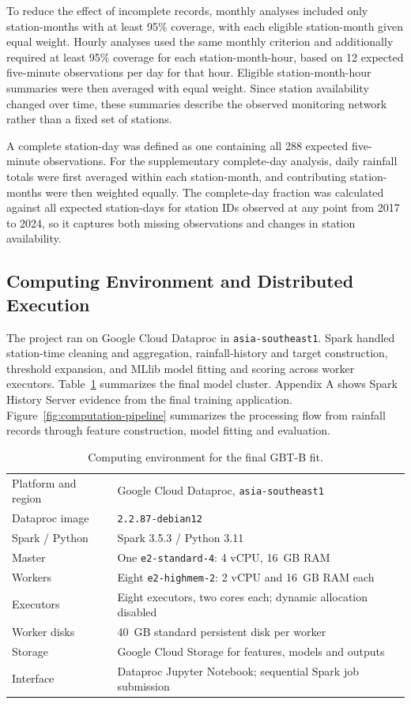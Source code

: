 \documentclass[11pt,a4paper]{article}
\begin{document}
To reduce the effect of incomplete records, monthly analyses included only
station-months with at least 95\% coverage, with each eligible station-month
given equal weight. Hourly analyses used the same monthly criterion and
additionally required at least 95\% coverage for each station-month-hour, based
on 12 expected five-minute observations per day for that hour. Eligible
station-month-hour summaries were then averaged with equal weight. Since
station availability changed over time, these summaries describe the observed
monitoring network rather than a fixed set of stations.

A complete station-day was defined as one containing all 288 expected
five-minute observations. For the supplementary complete-day analysis, daily
rainfall totals were first averaged within each station-month, and contributing
station-months were then weighted equally. The complete-day fraction was
calculated against all expected station-days for station IDs observed at any
point from 2017 to 2024, so it captures both missing observations and changes
in station availability.

\subsection{Computing Environment and Distributed Execution}
The project ran on Google Cloud Dataproc in \texttt{asia-southeast1}. Spark
handled station-time cleaning and aggregation, rainfall-history and target
construction, threshold expansion, and MLlib model fitting and scoring across
worker executors. Table~\ref{tab:cluster} summarizes the final model cluster.
Appendix A shows Spark History Server evidence from the final training
application. Figure~\ref{fig:computation-pipeline} summarizes the processing
flow from rainfall records through feature construction, model fitting and
evaluation.

\begin{table}[htbp]
\centering\small
\caption{Computing environment for the final GBT-B fit.}
\label{tab:cluster}
\begin{tabularx}{\linewidth}{l X}
\toprule
Platform and region & Google Cloud Dataproc, \texttt{asia-southeast1} \\
Dataproc image & \texttt{2.2.87-debian12} \\
Spark / Python & Spark 3.5.3 / Python 3.11 \\
Master & One \texttt{e2-standard-4}: 4 vCPU, 16~GB RAM \\
Workers & Eight \texttt{e2-highmem-2}: 2 vCPU and 16~GB RAM each \\
Executors & Eight executors, two cores each; dynamic allocation disabled \\
Worker disks & 40~GB standard persistent disk per worker \\
Storage & Google Cloud Storage for features, models and outputs \\
Interface & Dataproc Jupyter Notebook; sequential Spark job submission \\
\bottomrule
\end{tabularx}
\end{table}
\end{document}
